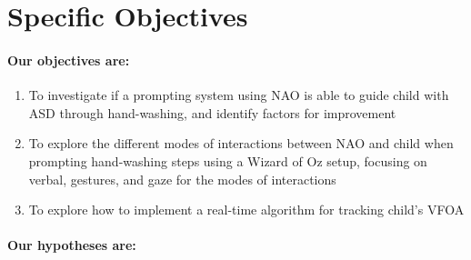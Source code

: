\section{Specific Objectives}

\paragraph{Our objectives are:}
\begin{enumerate}
	\item To investigate if a prompting system using NAO is able to guide child with ASD through hand-washing, and identify factors for improvement
	
	\item To explore the different modes of interactions between NAO and child when prompting hand-washing steps using a Wizard of Oz setup, focusing on verbal, gestures, and gaze for the modes of interactions
	
	\item To explore how to implement a real-time algorithm for tracking child's VFOA
\end{enumerate}



\paragraph{Our hypotheses are:}








